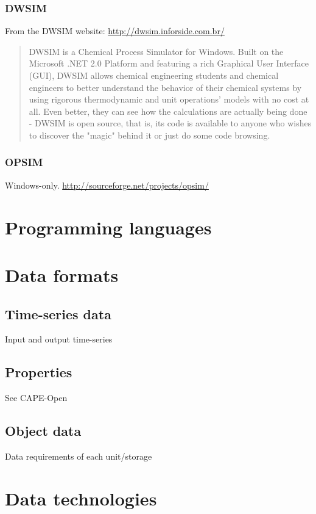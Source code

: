 \subsubsection{DWSIM}
\label{sec:dwsim}

From the DWSIM website: \url{http://dwsim.inforside.com.br/}
\begin{quote}
DWSIM is a Chemical Process Simulator for Windows. Built on the Microsoft .NET 2.0 Platform and featuring a rich Graphical User Interface (GUI), DWSIM allows chemical engineering students and chemical engineers to better understand the behavior of their chemical systems by using rigorous thermodynamic and unit operations' models with no cost at all. Even better, they can see how the calculations are actually being done - DWSIM is open source, that is, its code is available to anyone who wishes to discover the "magic" behind it or just do some code browsing. 
\end{quote}

\subsubsection{OPSIM}
\label{sec:opsim}
Windows-only.  \url{http://sourceforge.net/projects/opsim/}

\section{Programming languages}
\cite{chaves.nehrbass.ea2006octave}

\section{Data formats}
\subsection{Time-series data}
Input and output time-series

\subsection{Properties}
See CAPE-Open

\subsection{Object data}
Data requirements of each unit/storage

\section{Data technologies}
